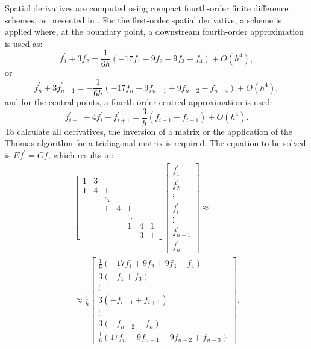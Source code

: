 \documentclass[preprint, 12pt]{elsarticle}
\begin{document}
Spatial derivatives are computed using compact fourth-order finite difference schemes, as presented in \citet{souza2003}. For the first-order spatial derivative, a scheme is applied where, at the boundary point, a downstream fourth-order approximation is used as:
\begin{equation}
    f_1^{\prime}+3 f_2^{\prime}=\frac{1}{ 6h}\left(-17f_1 + 9f_2 + 9f_3 - f_4 \right)+O\left(h^4\right),
\end{equation}
or
\begin{equation}
    f_n^{\prime} + 3f_{n-1}^{\prime} = -\frac{1}{ 6h}\left(-17f_{n} + 9f_{n-1} + 9f_{n-2} - f_{n-4} \right)+O\left(h^4\right),
\end{equation}
and for the central points, a fourth-order centred approximation is used:
\begin{equation}
    f_{i-1}^{\prime}+4 f_i^{\prime}+f_{i+1}^{\prime} = \frac{3}{ h}\left(f_{i+1}-f_{i-1}\right) +O\left(h^4\right).
\end{equation}
To calculate all derivatives, the inversion of a matrix or the application of the Thomas algorithm \cite{thomas1949} for a tridiagonal matrix is required. The equation to be solved is $E f^{\prime}=G f$, which results in:
\begin{align}
\left[\begin{array}{ccccccc}
    1 & 3 & & & & & \\
    1 & 4 & 1 & & & & \\
    & & \ddots & & & & \\
    & & 1 & 4 & 1 & & \\
    & & & & \ddots & & \\
    & & & & 1 & 4 & 1 \\
    & & & & & 3 & 1
\end{array}\right]\left[\begin{array}{c}
f_1^{\prime} \\
f_2^{\prime} \\
\vdots \\
f_i^{\prime} \\
\vdots \\
f_{n-1}^{\prime} \\
f_n^{\prime}
\end{array}\right] \approx \nonumber\\ \approx\frac{1}{h}\left[\begin{array}{c}\frac{1}{6}\left(-17f_1 + 9f_2 + 9f_3 - f_4 \right) \\ 3(- f_1 + f_3) \\ \vdots \\ 3\left(-f_{i-1}+f_{i+1}\right) \\ \vdots \\ 3\left(-f_{n-2}+f_{n}\right) \\ \frac{1}{6}\left(17f_n - 9f_{n-1} - 9f_{n-2} + f_{n-3}\right)\end{array}\right].
\end{align}
\end{document}
